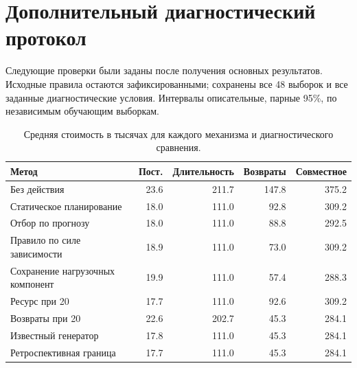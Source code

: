 \section{Дополнительный диагностический протокол}
Следующие проверки были заданы после получения основных результатов. Исходные правила остаются зафиксированными; сохранены все 48 выборок и все заданные диагностические условия. Интервалы описательные, парные 95\%, по независимым обучающим выборкам.

\begin{table}[p]\caption{Средняя стоимость в тысячах для каждого механизма и диагностического сравнения.}\centering\small\setlength{\tabcolsep}{3pt}\begin{tabular}{p{}rrrr}\toprule
Метод & Пост. & Длительность & Возвраты & Совместное\\\midrule
Без действия & 23.6 & 211.7 & 147.8 & 375.2\\
Статическое планирование & 18.0 & 111.0 & 92.8 & 309.2\\
Отбор по прогнозу & 18.0 & 111.0 & 88.8 & 292.5\\
Правило по силе зависимости & 18.9 & 111.0 & 73.0 & 309.2\\
Сохранение нагрузочных компонент & 19.9 & 111.0 & 57.4 & 288.3\\
Ресурс при 20 & 17.7 & 111.0 & 92.6 & 309.2\\
Возвраты при 20 & 22.6 & 202.7 & 45.3 & 284.1\\
Известный генератор & 17.8 & 111.0 & 45.3 & 284.1\\
Ретроспективная граница & 17.7 & 111.0 & 45.3 & 284.1\\
\bottomrule\end{tabular}\end{table}
